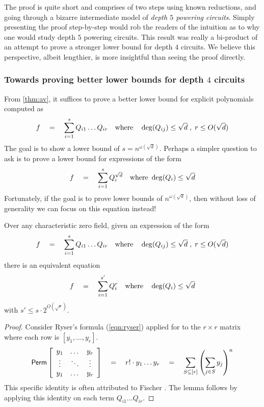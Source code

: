 The proof is quite short and comprises of two steps using known reductions, and going through a bizarre intermediate model of \emph{depth $5$ powering circuits}. Simply presenting the proof step-by-step would rob the readers of the intuition as to why one would study depth $5$ powering circuits. This result was really a bi-product of an attempt to prove a stronger lower bound for depth $4$ circuits. We believe this perspective, albeit lengthier, is more insightful than seeing the proof directly. 

\subsubsection{Towards proving better lower bounds for depth $4$ circuits}

From \autoref{thm:av}, it suffices to prove a better lower bound for explicit polynomials computed as
\begin{equation}\label{eqn:d4-LB}
f\quad = \quad \sum_{i=1}^s Q_{i1}\dots Q_{ir} \quad\text{where}\quad \deg(Q_{ij})\leq \sqrt{d}\;,\; r\leq O(\sqrt{d})
\end{equation}
The goal is to show a lower bound of $s = n^{\omega(\sqrt{d})}$. Perhaps a simpler question to ask is to prove a lower bound for expressions of the form
\begin{equation}\label{eqn:d4pow-LB}
f\quad = \quad \sum_{i=1}^s Q_{i}^{\sqrt{d}} \quad\text{where }\deg(Q_i)\leq \sqrt{d}
\end{equation}
Fortunately, if the goal is to prove lower bounds of $n^{\omega(\sqrt{d})}$, then without loss of generality we can focus on this equation instead! 

\begin{lemma}\label{lem:fischer}
Over any characteristic zero field, given an expression of the form 
\[
f\quad = \quad \sum_{i=1}^s Q_{i1}\dots Q_{ir} \quad\text{where}\quad \deg(Q_{ij})\leq \sqrt{d}\;,\; r\leq O(\sqrt{d})
\]
there is an equivalent equation
\[
f\quad = \quad \sum_{i=1}^{s'} Q_{i}^r\quad\text{where}\quad \deg(Q_{i})\leq \sqrt{d}
\]
with $s' \leq s \cdot 2^{O(\sqrt{r})}$. 
\end{lemma}
\begin{proof}
Consider Ryser's formula (\ref{eqn:ryser}) applied for to the $r\times r$ matrix where each row is $[y_1,\dots, y_r]$. 
\[
\mathsf{Perm} \left[\begin{array}{ccc} y_1 & \dots & y_r\\ \vdots & \ddots & \vdots \\ y_1 & \dots & y_r\end{array}\right] \quad = \quad r! \cdot y_1\dots y_r \quad = \quad \sum_{S\subseteq [r]} \left(\sum_{j\in S} y_j\right)^n
\]
This specific identity is often attributed to Fischer \cite{fischer}. The lemma follows by applying this identity on each term $Q_{i1}\dots Q_{ir}$. 
\end{proof}

